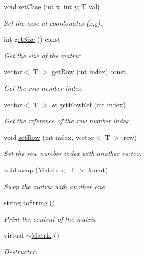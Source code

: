 \begin{DoxyCompactItemize}
void \mbox{\hyperlink{class_matrix_a84a92f3cf3e0555ef871c6e676c12e38}{set\+Case}} (int x, int y, T val)
\begin{DoxyCompactList}\small\item\em Set the case at coordonates (x,y). \end{DoxyCompactList}\item 
int \mbox{\hyperlink{class_matrix_ad51826b8a17c6c58df6b580893754543}{get\+Size}} () const
\begin{DoxyCompactList}\small\item\em Get the size of the matrix. \end{DoxyCompactList}\item 
vector$<$ T $>$ \mbox{\hyperlink{class_matrix_ac7ba1c9a4c54c456542906d7c7aaba58}{get\+Row}} (int index) const
\begin{DoxyCompactList}\small\item\em Get the row number index. \end{DoxyCompactList}\item 
vector$<$ T $>$ \& \mbox{\hyperlink{class_matrix_ae94e4cab3fb53678a7994f605f606595}{get\+Row\+Ref}} (int index)
\begin{DoxyCompactList}\small\item\em Get the reference of the row number index. \end{DoxyCompactList}\item 
void \mbox{\hyperlink{class_matrix_ad594e62f75a6dd6d1bcd903b33a09e61}{set\+Row}} (int index, vector$<$ T $>$ row)
\begin{DoxyCompactList}\small\item\em Set the row number index with another vector. \end{DoxyCompactList}\item 
void \mbox{\hyperlink{class_matrix_a39fc509f53b388925f388a66010da58a}{swap}} (\mbox{\hyperlink{class_matrix}{Matrix}}$<$ T $>$ \&mat)
\begin{DoxyCompactList}\small\item\em Swap the matrix with another one. \end{DoxyCompactList}\item 
string \mbox{\hyperlink{class_matrix_af097d64195b0bfa5842d9ee39b448297}{to\+String}} ()
\begin{DoxyCompactList}\small\item\em Print the content of the matrix. \end{DoxyCompactList}\item 
virtual \mbox{\hyperlink{class_matrix_a91aa704de674203e96aece9e1955ccd3}{$\sim$\+Matrix}} ()
\begin{DoxyCompactList}\small\item\em Destructor. \end{DoxyCompactList}\end{DoxyCompactItemize}


